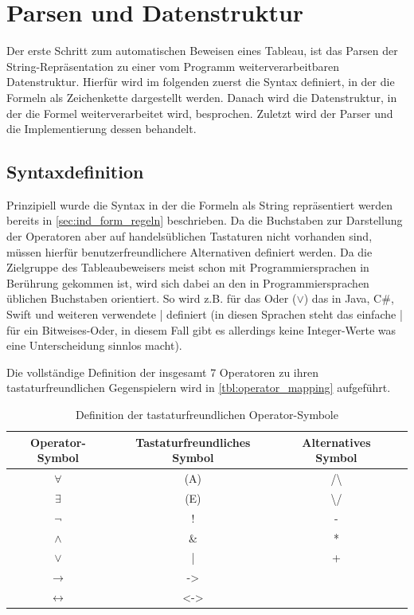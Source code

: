
\chapter{\label{sec:parsen}Parsen und Datenstruktur}
Der erste Schritt zum automatischen Beweisen eines Tableau, ist das Parsen der String-Repräsentation zu einer vom Programm weiterverarbeitbaren Datenstruktur. Hierfür wird im folgenden zuerst die Syntax definiert, in der die Formeln als Zeichenkette dargestellt werden. Danach wird die Datenstruktur, in der die Formel weiterverarbeitet wird, besprochen. Zuletzt wird der Parser und die Implementierung dessen behandelt.

\section{\label{sec:syntaxdef}Syntaxdefinition}
Prinzipiell wurde die Syntax in der die Formeln als String repräsentiert werden bereits in \autoref{sec:ind_form_regeln} beschrieben. Da die Buchstaben zur Darstellung der Operatoren aber auf handelsüblichen Tastaturen nicht vorhanden sind, müssen hierfür benutzerfreundlichere Alternativen definiert werden. Da die Zielgruppe des Tableaubeweisers meist schon mit Programmiersprachen in Berührung gekommen ist, wird sich dabei an den in Programmiersprachen üblichen Buchstaben orientiert. So wird z.B. für das Oder ($\vee$) das in Java, C\#, Swift und weiteren verwendete | definiert (in diesen Sprachen steht das einfache | für ein Bitweises-Oder, in diesem Fall gibt es allerdings keine Integer-Werte was eine Unterscheidung sinnlos macht).

Die vollständige Definition der insgesamt 7 Operatoren zu ihren tastaturfreundlichen Gegenspielern wird in \autoref{tbl:operator_mapping} aufgeführt.
\begin{table}[h]
\begin{center}
\begin{tabular}{|c|c|c|c|}
\hline
Operator-Symbol & Tastaturfreundliches Symbol & Alternatives Symbol \\
\hline
$\forall$ & (A) & /\textbackslash \\
\hline
$\exists$ & (E) & \textbackslash/ \\
\hline
$\neg$ & ! & - \\
\hline
$\wedge$ & \& & * \\
\hline
$\vee$ & | & + \\
\hline
$\rightarrow$ & -> & \\
\hline
$\leftrightarrow$ & <-> & \\
\hline
\end{tabular}
\end{center}
\caption{\label{tbl:operator_mapping}Definition der tastaturfreundlichen Operator-Symbole}
\end{table}

